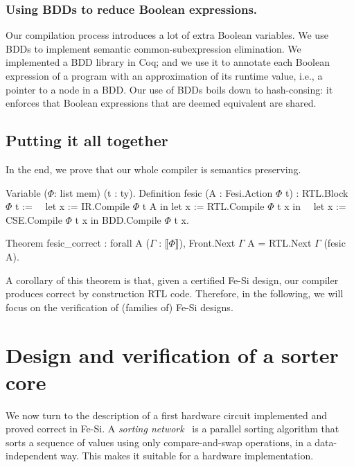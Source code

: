 \documentclass{llncs}
\newcommand{\denote}[1]{\llbracket #1 \rrbracket}
\begin{document}
\subsubsection{Using BDDs to reduce Boolean expressions.}
Our compilation process introduces a lot of extra Boolean
variables. We use BDDs to implement semantic common-subexpression
elimination. We implemented a BDD library in Coq; and we use it to
annotate each Boolean expression of a program with an approximation of
its runtime value, i.e., a pointer to a node in a BDD.
%
Our use of BDDs boils down to hash-consing: it enforces that Boolean
expressions that are deemed equivalent are shared.

\subsection{Putting it all together}
In the end, we prove that our whole compiler is semantics preserving.

\begin{coq}
Variable ($\Phi$: list mem) (t : ty). 
Definition fesic  (A : Fesi.Action $\Phi$ t) : RTL.Block $\Phi$ t :=  
$\quad$let x := IR.Compile $\Phi$  t A in let x := RTL.Compile $\Phi$ t x in  
$\quad$let x := CSE.Compile $\Phi$ t x in BDD.Compile $\Phi$ t x.

Theorem fesic_correct : forall A ($\Gamma$ : $\denote{\Phi}$), Front.Next $\Gamma$ A = RTL.Next $\Gamma$ (fesic A).\end{coq}

A corollary of this theorem is that, given a certified Fe-Si design,
our compiler produces correct by construction RTL code. Therefore, in
the following, we will focus on the verification of (families of)
Fe-Si designs. 

\section{Design and verification of a sorter core}
We now turn to the description of a first hardware circuit implemented
and proved correct in Fe-Si. 
%
A \emph{sorting network}~\cite{DBLP:books/mg/CormenLRS01} is a
parallel sorting algorithm that sorts a sequence of values using only
compare-and-swap operations, in a data-independent way. This makes it
suitable for a hardware implementation.
\end{document}
